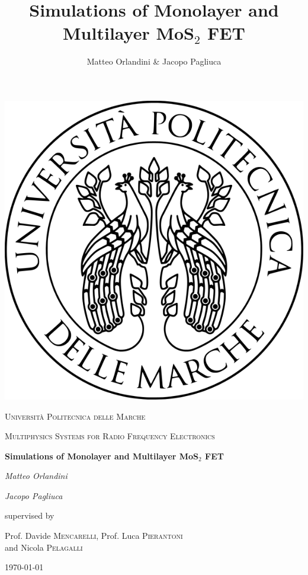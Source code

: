 \documentclass[12pt,a4paper,titlepage]{article}
\title{Simulations of Monolayer and Multilayer MoS$_2$ FET}
\author{Matteo Orlandini \& Jacopo Pagliuca}
\date{}
\newcommand{\CoverName}{Cover}
\begin{document}
\renewcommand{\thepage}{\CoverName}
\begin{titlepage}
	
	\centering
	\includegraphics[width=.2\textwidth]{Immagini/univpmlogo}\par\vspace{1cm}
	{\scshape\LARGE Università Politecnica delle Marche\par}
	\vspace{1cm}
	{\scshape\Large Multiphysics Systems for Radio Frequency Electronics\par}
	\vspace{1.5cm}
	{\huge\bfseries  Simulations of Monolayer and Multilayer MoS$_2$ FET \par}
	\vspace{2cm}
	{\Large\itshape Matteo Orlandini \par}
	{\Large\itshape Jacopo Pagliuca\par}
	\vfill
	supervised by\par
	Prof. Davide \textsc{Mencarelli}, Prof. Luca \textsc{Pierantoni}\\ and Nicola \textsc{Pelagalli}
	
	\vfill
	
	{\large \today\par}
\end{titlepage}

\thispagestyle{empty}
\tableofcontents

\newpage
{}
\setcounter{page}{1}
\end{document}
